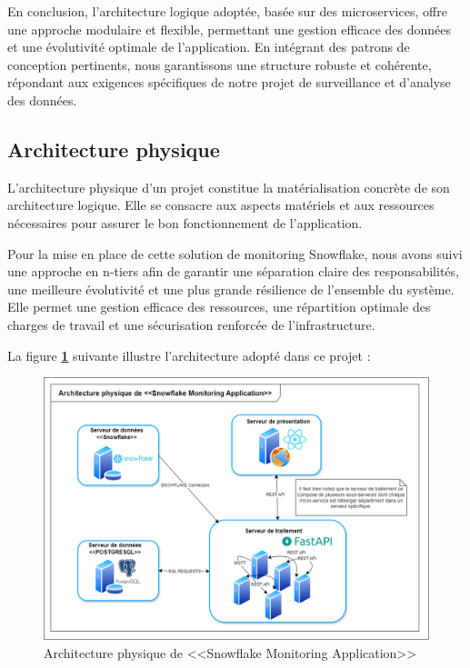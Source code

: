 \par En conclusion, l'architecture logique adoptée, basée sur des microservices, offre une approche modulaire et flexible, permettant une gestion efficace des données et une évolutivité optimale de l'application. En intégrant des patrons de conception pertinents,
 nous garantissons une structure robuste et cohérente, répondant aux exigences spécifiques de notre projet de surveillance et d'analyse des données.
\subsection{Architecture physique}
    \par L'architecture physique d'un projet constitue la matérialisation concrète de son architecture logique. Elle se consacre aux aspects matériels et aux ressources nécessaires pour assurer le bon fonctionnement de l'application\cite{archi_phy}.
    \par Pour la mise en place de cette solution de monitoring Snowflake, nous avons suivi une approche en n-tiers afin de garantir une séparation claire des responsabilités, 
    une meilleure évolutivité et une plus grande résilience de l'ensemble du système. 
    Elle permet une gestion efficace des ressources, une répartition optimale des charges de travail et une sécurisation renforcée de l'infrastructure. 
    \par La figure \textbf{\ref{fig :arch_phy}} suivante illustre l'architecture adopté dans ce projet  : 
        \begin{figure}[H]
        \centering
        \includegraphics[width = 17cm ]{img/conception/archi_phy.png}
        \caption{Architecture physique de <<Snowflake Monitoring Application>>}
        \label{fig :arch_phy}
        \end{figure}
